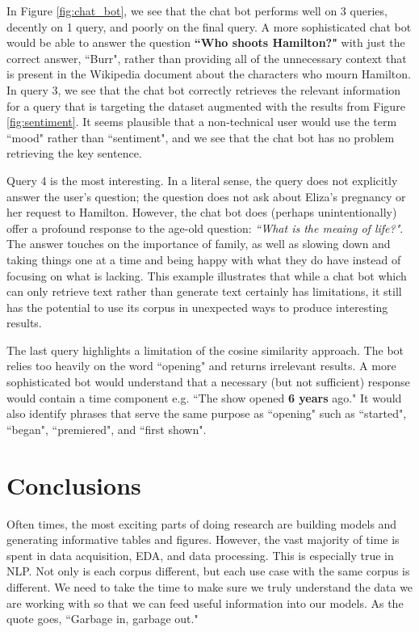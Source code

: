 \documentclass{article}
\begin{document}
In Figure \ref{fig:chat_bot}, we see that the chat bot performs well on 3 queries, decently on 1 query, and poorly on the final query. A more sophisticated chat bot would be able to answer the question \textbf{``Who shoots Hamilton?"} with just the correct answer, ``Burr", rather than providing all of the unnecessary context that is present in the Wikipedia document about the characters who mourn Hamilton. In query 3, we see that the chat bot correctly retrieves the relevant information for a query that is targeting the dataset augmented with the results from Figure \ref{fig:sentiment}. It seems plausible that a non-technical user would use the term ``mood" rather than ``sentiment", and we see that the chat bot has no problem retrieving the key sentence. 

Query 4 is the most interesting. In a literal sense, the query does not explicitly answer the user's question; the question does not ask about Eliza's pregnancy or her request to Hamilton. However, the chat bot does (perhaps unintentionally) offer a profound response to the age-old question: \emph{``What is the meaing of life?"}. The answer touches on the importance of family, as well as slowing down and taking things one at a time and being happy with what they do have instead of focusing on what is lacking. This example illustrates that while a chat bot which can only retrieve text rather than generate text certainly has limitations, it still has the potential to use its corpus in unexpected ways to produce interesting results.

The last query highlights a limitation of the cosine similarity approach. The bot relies too heavily on the word ``opening" and returns irrelevant results. A more sophisticated bot would understand that a necessary (but not sufficient) response would contain a time component e.g. ``The show opened \textbf{6 years} ago." It would also identify phrases that serve the same purpose as ``opening" such as ``started", ``began", ``premiered", and ``first shown". 

\section{Conclusions}

Often times, the most exciting parts of doing research are building models and generating informative tables and figures. However, the vast majority of time is spent in data acquisition, EDA, and data processing. This is especially true in NLP. Not only is each corpus different, but each use case with the same corpus is different. We need to take the time to make sure we truly understand the data we are working with so that we can feed useful information into our models. As the quote goes, ``Garbage in, garbage out."
\end{document}
